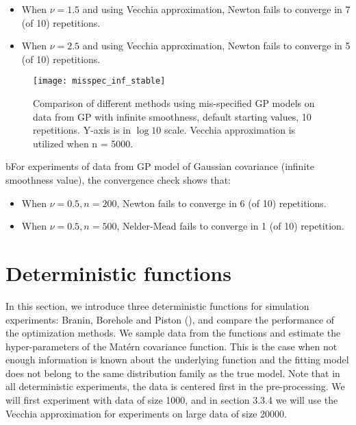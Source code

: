 \begin{itemize}
    \item When $\nu=1.5$ and using Vecchia approximation, Newton fails to converge in 7 (of 10) repetitions.
    \item When $\nu=2.5$ and using Vecchia approximation, Newton fails to converge in 5 (of 10) repetitions.
\end{itemize} 

\begin{figure}[hbt!]%
  \centering
  \texttt{[image: misspec\_inf\_stable]} %
  \caption[Times of mis-specified GP with infinite smoothness: graphs of different line types with range bars]
  {Comparison of different methods using mis-specified GP models on data from GP with infinite smoothness, default starting values, 10 repetitions. Y-axis is in $\log 10$ scale. Vecchia approximation is utilized when n = 5000.}
  \label{fig:matern_mis_Inf}
\end{figure}

bFor experiments of data from GP model of Gaussian covariance (infinite smoothness value), the convergence check shows that:

\begin{itemize}
    \item When $\nu=0.5, n=200$, Newton fails to converge in 6 (of 10) repetitions.
    \item When $\nu=0.5, n=500$, Nelder-Mead fails to converge in 1 (of 10) repetition.
\end{itemize} 
 
\section{Deterministic functions}

In this section, we introduce three deterministic functions for simulation experiments: Branin, Borehole and Piston (\cite{simulationlib}), and compare the performance of the optimization methods. We sample data from the functions and estimate the hyper-parameters of the Mat\'ern covariance function. This is the case when not enough information is known about the underlying function and the fitting model does not belong to the same distribution family as the true model. Note that in all deterministic experiments, the data is centered first in the pre-processing. We will first experiment with data of size 1000, and in section 3.3.4 we will use the Vecchia approximation for experiments on large data of size 20000.

